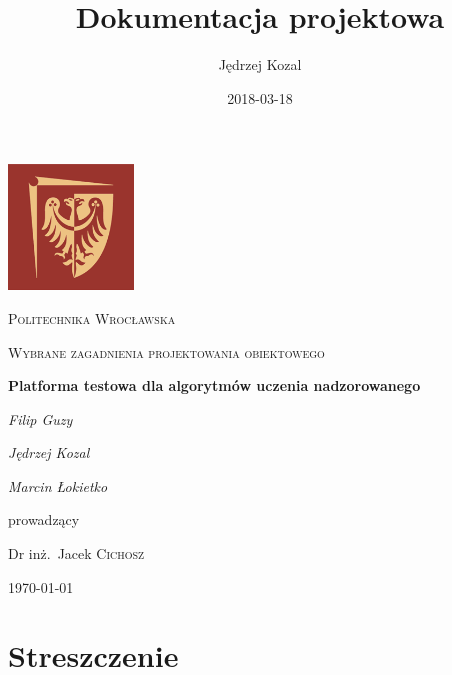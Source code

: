 \documentclass[12pt]{article}
\title{Dokumentacja projektowa}
\date{2018-03-18}
\author{Jędrzej Kozal}
\begin{document}


\begin{titlepage}
	\centering
	\includegraphics[width=0.25\textwidth]{logo_pol_wroclaw.png}\par\vspace{1cm}
	{\scshape\LARGE Politechnika Wrocławska \par}
	\vspace{1cm}
	{\scshape\Large Wybrane zagadnienia projektowania obiektowego\par}
	\vspace{1.5cm}
	{\huge\bfseries Platforma testowa dla algorytmów uczenia nadzorowanego \par}
	\vspace{2cm}
	{\Large\itshape Filip Guzy\par}
	{\Large\itshape Jędrzej Kozal\par}
	{\Large\itshape Marcin Łokietko\par}

	\vfill
	prowadzący\par
	Dr inż.~Jacek \textsc{Cichosz}

	\vfill

	{\large \today\par}
\end{titlepage}

\tableofcontents
\newpage


\section{Streszczenie}
\end{document}
